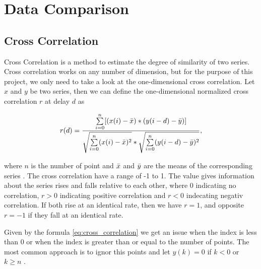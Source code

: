 \section{Data Comparison}

\subsection{Cross Correlation}
\label{sec:cross_correlation}
Cross Correlation is a method to estimate the degree of similarity of two series. Cross correlation works on any number of dimension, but for the purpose of this project, we only need to take a look at the one-dimensional cross correlation. Let $x$ and $y$ be two series, then we can define the one-dimensional normalized cross correlation $r$ at delay $d$ as	

\begin{equation}
\label{eq:cross_correlation}
    r(d) = \frac{\sum\limits_{i=0}\limits^{n} [(x(i) - \bar{x}) * (y(i-d) - \bar{y})]}{\sqrt{\sum\limits_{i=0}\limits^{n} (x(i) - \bar{x})^{2}} * \sqrt{\sum\limits_{i=0}\limits^{n} (y(i-d) - \bar{y})^{2}}},
\end{equation}

where $n$ is the number of point and $\bar{x}$ and $\bar{y}$ are the means of the corresponding series \cite{cross_correlation_theory}. The cross correlation have a range of -1 to 1. The value gives information about the series rises and falls relative to each other, where 0 indicating no correlation, $r > 0$ indicating positive correlation and  $r < 0$ indecating negativ correlation. If both rise at an identical rate, then we have $r = 1$, and opposite $r = -1$ if they fall at an identical rate. 

Given by the formula \ref{eq:cross_correlation} we get an issue when the index is less than 0 or when the index is greater than or equal to the number of points. The most common approach is to ignor this points and let $y(k) = 0$ if $k < 0$ or $k \geq n$ \cite{cross_correlation_code}.